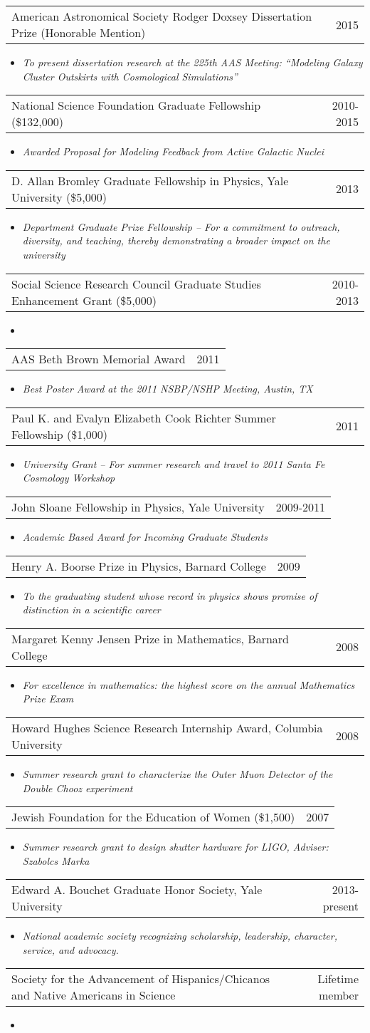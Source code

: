 \documentclass[letterpaper,11pt]{article}
\makeatletter
\newcommand{\resheading}[1]{{\large \parashade[.9]{sharpcorners}{\textbf{#1 \vphantom{p\^{E}}}}}\vspace{-10pt}}
\newcommand{\activities}[3]{
  \begin{tabular*}{7.05in}{l@{\extracolsep{\fill}}r}
    #1&#2\vspace{-15pt}
    \end{tabular*}
    \begin{itemize}
      \item[] {\it #3}\vspace{-5pt}
      \end{itemize}
}
\makeatother
\begin{document}
\activities{American Astronomical Society Rodger Doxsey Dissertation
  Prize (Honorable Mention)}{2015}{To present dissertation research at
  the 225th AAS Meeting: ``Modeling Galaxy Cluster Outskirts with
  Cosmological Simulations''}

\activities{National Science Foundation Graduate Fellowship
  (\$132,000)}{2010-2015}{Awarded Proposal for Modeling Feedback from
  Active Galactic Nuclei}

\activities{D. Allan Bromley Graduate Fellowship in Physics, Yale
  University (\$5,000)}{2013}{Department Graduate Prize Fellowship --
  For a commitment to outreach, diversity, and teaching, thereby
  demonstrating a broader impact on the university}

\activities{Social Science Research Council Graduate Studies
  Enhancement Grant (\$5,000)}{2010-2013}{\vspace{-20pt}}

\activities{AAS Beth Brown Memorial Award}{2011}{Best Poster Award at
  the 2011 NSBP/NSHP Meeting, Austin, TX}

\activities{Paul K. and Evalyn Elizabeth Cook Richter Summer
  Fellowship (\$1,000)}{2011}{University Grant -- For summer
  research and travel to 2011 Santa Fe Cosmology Workshop}

\activities{John Sloane Fellowship in Physics, Yale
  University}{2009-2011}{Academic Based Award for Incoming Graduate Students}

\activities{Henry A. Boorse Prize in Physics, Barnard
  College}{2009}{To the graduating student whose record in physics
  shows promise of distinction in a scientific career}

\activities{Margaret Kenny Jensen Prize in Mathematics, Barnard
  College}{2008}{For excellence in mathematics: the highest
  score on the annual Mathematics Prize Exam}

\activities{Howard Hughes Science Research Internship Award, Columbia
  University}{2008}{Summer research grant to characterize the Outer
  Muon Detector of the Double Chooz experiment}

\activities{Jewish Foundation for the Education of Women
  (\$1,500)}{2007}{Summer research grant to design shutter hardware
  for LIGO, Adviser: Szabolcs Marka}

\resheading{Professional Societies}

\activities{Edward A. Bouchet Graduate Honor Society, Yale
  University}{2013-present}{National academic society recognizing
  scholarship, leadership, character, service, and advocacy.}
\activities{Society for the Advancement of Hispanics/Chicanos and
  Native Americans in Science}{Lifetime member}{\vspace{-20pt}}
\end{document}

